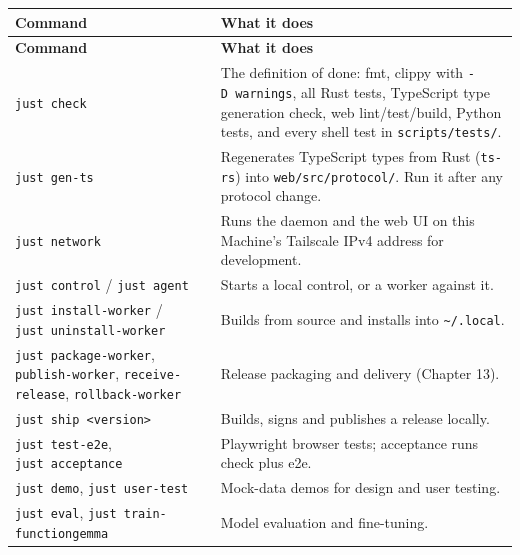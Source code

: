 \begin{small}
\begin{longtable}{>{\raggedright\arraybackslash}p{0.469\dimexpr \linewidth-4\tabcolsep\relax}>{\raggedright\arraybackslash}p{0.531\dimexpr \linewidth-4\tabcolsep\relax}}
\toprule
\textbf{Command} & \textbf{What it does} \\
\midrule
\endfirsthead
\toprule
\textbf{Command} & \textbf{What it does} \\
\midrule
\endhead
\texttt{just\ check} & The definition of done: fmt, clippy with \texttt{-{}\allowbreak{}D\ warnings}, all Rust tests, TypeScript type generation check, web lint/test/build, Python tests, and every shell test in \texttt{scripts/\allowbreak{}tests/\allowbreak{}}. \\
\texttt{just\ gen-{}\allowbreak{}ts} & Regenerates TypeScript types from Rust (\texttt{ts-{}\allowbreak{}rs}) into \texttt{web/\allowbreak{}src/\allowbreak{}protocol/\allowbreak{}}. Run it after any protocol change. \\
\texttt{just\ network} & Runs the daemon and the web UI on this Machine's Tailscale IPv4 address for development. \\
\texttt{just\ control} / \texttt{just\ agent} & Starts a local control, or a worker against it. \\
\texttt{just\ install-{}\allowbreak{}worker} / \texttt{just\ uninstall-{}\allowbreak{}worker} & Builds from source and installs into \texttt{\textasciitilde{}/\allowbreak{}.\allowbreak{}local}. \\
\texttt{just\ package-{}\allowbreak{}worker}, \texttt{publish-{}\allowbreak{}worker}, \texttt{receive-{}\allowbreak{}release}, \texttt{rollback-{}\allowbreak{}worker} & Release packaging and delivery (Chapter 13). \\
\texttt{just\ ship\ \textless{}version\textgreater{}} & Builds, signs and publishes a release locally. \\
\texttt{just\ test-{}\allowbreak{}e2e}, \texttt{just\ acceptance} & Playwright browser tests; acceptance runs check plus e2e. \\
\texttt{just\ demo}, \texttt{just\ user-{}\allowbreak{}test} & Mock-data demos for design and user testing. \\
\texttt{just\ eval}, \texttt{just\ train-{}\allowbreak{}functiongemma} & Model evaluation and fine-tuning. \\
\bottomrule
\end{longtable}
\end{small}

